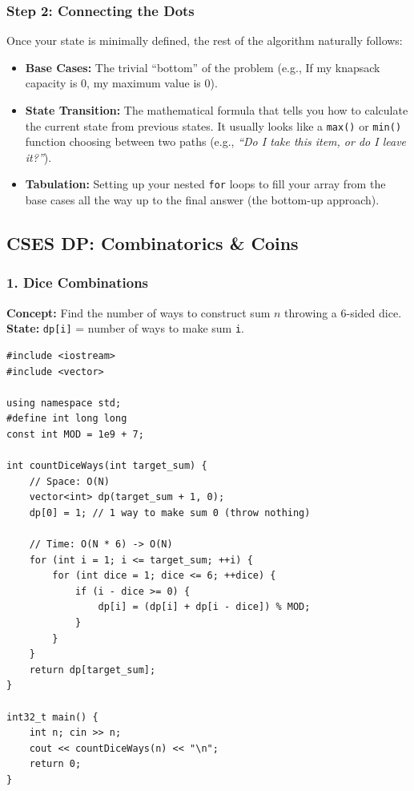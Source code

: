 \subsubsection{Step 2: Connecting the Dots}
Once your state is minimally defined, the rest of the algorithm naturally follows:
\begin{itemize}
    \item \textbf{Base Cases:} The trivial ``bottom'' of the problem (e.g., If my knapsack capacity is 0, my maximum value is 0).
    \item \textbf{State Transition:} The mathematical formula that tells you how to calculate the current state from previous states. It usually looks like a \texttt{max()} or \texttt{min()} function choosing between two paths (e.g., \textit{``Do I take this item, or do I leave it?''}).
    \item \textbf{Tabulation:} Setting up your nested \texttt{for} loops to fill your array from the base cases all the way up to the final answer (the bottom-up approach).
\end{itemize}

\subsection{CSES DP: Combinatorics \& Coins}

\subsubsection{1. Dice Combinations}
\textbf{Concept:} Find the number of ways to construct sum $n$ throwing a 6-sided dice. \\
\textbf{State:} \texttt{dp[i]} = number of ways to make sum \texttt{i}.

\begin{lstlisting}
#include <iostream>
#include <vector>

using namespace std;
#define int long long
const int MOD = 1e9 + 7;

int countDiceWays(int target_sum) {
    // Space: O(N)
    vector<int> dp(target_sum + 1, 0); 
    dp[0] = 1; // 1 way to make sum 0 (throw nothing)
    
    // Time: O(N * 6) -> O(N)
    for (int i = 1; i <= target_sum; ++i) {
        for (int dice = 1; dice <= 6; ++dice) {
            if (i - dice >= 0) {
                dp[i] = (dp[i] + dp[i - dice]) % MOD;
            }
        }
    }
    return dp[target_sum];
}

int32_t main() {
    int n; cin >> n;
    cout << countDiceWays(n) << "\n";
    return 0;
}
\end{lstlisting}

